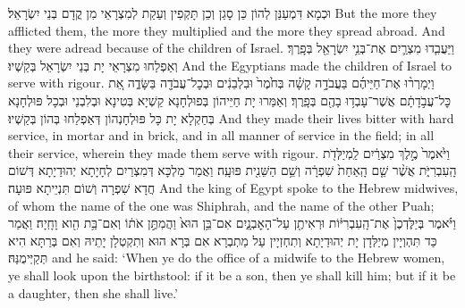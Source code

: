 {{וּכְמָא דִּמְעַנַּן לְהוֹן כֵּן סָגַן וְכֵן תָּקְפִין וְעַקַת לְמִצְרָאֵי מִן קֳדָם בְּנֵי יִשְׂרָאֵל׃}
{But the more they afflicted them, the more they multiplied and the more they spread abroad. And they were adread because of the children of Israel.}{}
{וַיַּעֲבִ֧דוּ מִצְרַ֛יִם אֶת־בְּנֵ֥י יִשְׂרָאֵ֖ל בְּפָֽרֶךְ׃
}
{וְאַפְלַחוּ מִצְרָאֵי יָת בְּנֵי יִשְׂרָאֵל בְּקַשְׁיוּ׃}
{And the Egyptians made the children of Israel to serve with rigour.}{}
{וַיְמָרְר֨וּ אֶת־חַיֵּיהֶ֜ם בַּעֲבֹדָ֣ה קָשָׁ֗ה בְּחֹ֙מֶר֙ וּבִלְבֵנִ֔ים וּבְכׇל־עֲבֹדָ֖ה בַּשָּׂדֶ֑ה אֵ֚ת כׇּל־עֲבֹ֣דָתָ֔ם אֲשֶׁר־עָבְד֥וּ בָהֶ֖ם בְּפָֽרֶךְ׃}
{וְאַמַּרוּ יָת חַיֵּיהוֹן בְּפוּלְחָנָא קַשְׁיָא בְּטִינָא וּבְלִבְנֵי וּבְכָל פּוּלְחָנָא בְּחַקְלָא יָת כָּל פּוּלְחָנְהוֹן דְּאַפְלַחוּ בְּהוֹן בְּקַשְׁיוּ׃}
{And they made their lives bitter with hard service, in mortar and in brick, and in all manner of service in the field; in all their service, wherein they made them serve with rigour.}{}
{וַיֹּ֙אמֶר֙ מֶ֣לֶךְ מִצְרַ֔יִם לַֽמְיַלְּדֹ֖ת הָֽעִבְרִיֹּ֑ת אֲשֶׁ֨ר שֵׁ֤ם הָֽאַחַת֙ שִׁפְרָ֔ה וְשֵׁ֥ם הַשֵּׁנִ֖ית פּוּעָֽה׃
}
{וַאֲמַר מַלְכָּא דְּמִצְרַיִם לְחָיָתָא יְהוּדַיָתָא דְּשׁוֹם חֲדָא שִׁפְרָה וְשׁוֹם תִּנְיֵיתָא פּוּעָה׃}
{And the king of Egypt spoke to the Hebrew midwives, of whom the name of the one was Shiphrah, and the name of the other Puah;}{}
{וַיֹּ֗אמֶר בְּיַלֶּדְכֶן֙ אֶת־הָֽעִבְרִיּ֔וֹת וּרְאִיתֶ֖ן עַל־הָאׇבְנָ֑יִם אִם־בֵּ֥ן הוּא֙ וַהֲמִתֶּ֣ן אֹת֔וֹ וְאִם־בַּ֥ת הִ֖וא וָחָֽיָה׃
}
{וַאֲמַר כַּד תִּהְוְיָין מְיַלְּדָן יָת יְהוּדַיָתָא וְתִחְזְיָין עַל מַתְבְרָא אִם בְּרָא הוּא וְתִקְטְלָן יָתֵיהּ וְאִם בְּרַתָּא הִיא תְּקַיְּימֻנַּהּ׃}
{and he said: ‘When ye do the office of a midwife to the Hebrew women, ye shall look upon the birthstool: if it be a son, then ye shall kill him; but if it be a daughter, then she shall live.’}{}
}
